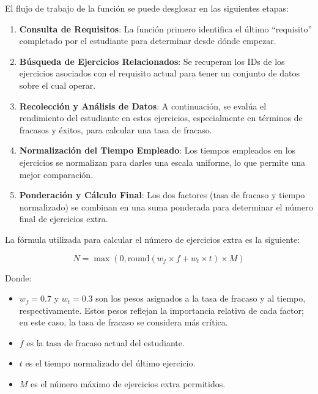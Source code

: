 El flujo de trabajo de la función se puede desglosar en las siguientes etapas:

\begin{enumerate}
    \item \textbf{Consulta de Requisitos}: La función primero identifica el último ``requisito'' completado por el estudiante para determinar desde dónde empezar.
    \item \textbf{Búsqueda de Ejercicios Relacionados}: Se recuperan los IDs de los ejercicios asociados con el requisito actual para tener un conjunto de datos sobre el cual operar.
    \item \textbf{Recolección y Análisis de Datos}: A continuación, se evalúa el rendimiento del estudiante en estos ejercicios, especialmente en términos de fracasos y éxitos, para calcular una tasa de fracaso.
    \item \textbf{Normalización del Tiempo Empleado}: Los tiempos empleados en los ejercicios se normalizan para darles una escala uniforme, lo que permite una mejor comparación.
    \item \textbf{Ponderación y Cálculo Final}: Los dos factores (tasa de fracaso y tiempo normalizado) se combinan en una suma ponderada para determinar el número final de ejercicios extra.
\end{enumerate}

La fórmula utilizada para calcular el número de ejercicios extra es la siguiente:

\begin{equation}
N = \max\left(0, \text{round}\left( w_f \times f + w_t \times t \right) \times M \right)
\end{equation}

Donde:

\begin{itemize}
    \item \( w_f = 0.7 \) y \( w_t = 0.3 \) son los pesos asignados a la tasa de fracaso y al tiempo, respectivamente. Estos pesos reflejan la importancia relativa de cada factor; en este caso, la tasa de fracaso se considera más crítica.
    \item \( f \) es la tasa de fracaso actual del estudiante.
    \item \( t \) es el tiempo normalizado del último ejercicio.
    \item \( M \) es el número máximo de ejercicios extra permitidos.
\end{itemize}

